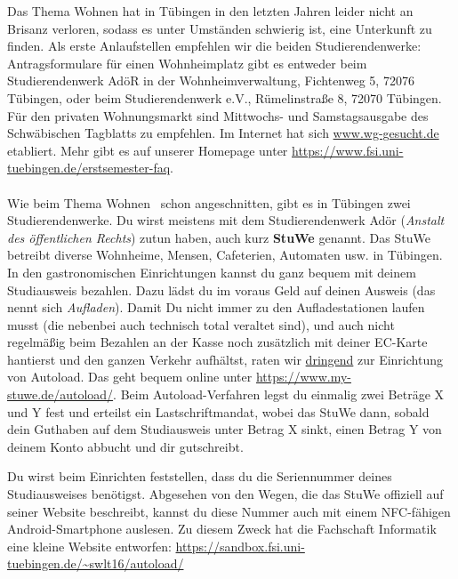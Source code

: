     Das Thema Wohnen hat in Tübingen in den letzten Jahren leider nicht an Brisanz verloren, sodass
    es unter Umständen schwierig ist, eine Unterkunft zu finden. Als erste Anlaufstellen empfehlen wir
    die beiden Studierendenwerke: Antragsformulare für einen Wohnheimplatz gibt es entweder beim
    Studierendenwerk AdöR in der Wohnheimverwaltung, Fichtenweg 5, 72076 Tübingen, oder beim Studierendenwerk
    e.V., Rümelinstraße 8, 72070 Tübingen. Für den privaten Wohnungsmarkt sind Mittwochs- und Samstagsausgabe
    des Schwäbischen Tagblatts zu empfehlen.
    Im Internet hat sich \url{www.wg-gesucht.de} etabliert. Mehr gibt es auf unserer Homepage unter \url{https://www.fsi.uni-tuebingen.de/erstsemester-faq}. \\\\

    Wie beim Thema \glqq Wohnen \grqq \ schon angeschnitten, gibt es in Tübingen zwei Studierendenwerke.
    Du wirst meistens mit dem Studierendenwerk Adör (\textit{Anstalt des öffentlichen Rechts}) zutun haben, auch kurz \textbf{StuWe} genannt.
    Das StuWe betreibt diverse Wohnheime, Mensen, Cafeterien, Automaten usw. in Tübingen. In den gastronomischen Einrichtungen
    kannst du ganz bequem mit deinem Studiausweis bezahlen. Dazu lädst du im voraus Geld auf deinen Ausweis (das nennt sich \textit{Aufladen}).
    Damit Du nicht immer zu den Aufladestationen laufen musst (die nebenbei auch technisch total veraltet sind), und auch nicht
    regelmäßig beim Bezahlen an der Kasse noch zusätzlich mit deiner EC-Karte hantierst und den ganzen Verkehr aufhältst, raten 
    wir \underline{dringend} zur Einrichtung von Autoload. Das geht bequem online unter \url{https://www.my-stuwe.de/autoload/}.
    Beim Autoload-Verfahren legst du einmalig zwei Beträge X und Y fest und erteilst ein Lastschriftmandat, 
    wobei das StuWe dann, sobald dein Guthaben auf dem Studiausweis unter Betrag X sinkt, einen Betrag Y von deinem Konto abbucht und dir gutschreibt.

    Du wirst beim Einrichten feststellen, dass du die Seriennummer deines Studiausweises benötigst. Abgesehen von den Wegen, die 
    das StuWe offiziell auf seiner Website beschreibt, kannst du diese Nummer auch mit einem NFC-fähigen Android-Smartphone auslesen.
    Zu diesem Zweck hat die Fachschaft Informatik eine kleine Website entworfen: \url{https://sandbox.fsi.uni-tuebingen.de/\~swlt16/autoload/}

